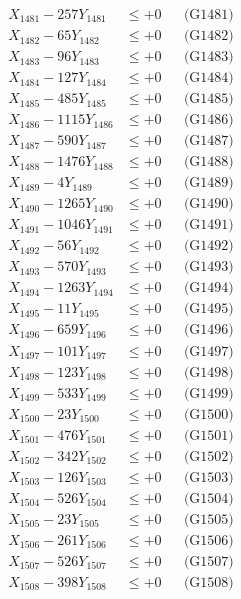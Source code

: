 \documentclass[a4paper,10pt]{article}
\begin{document}
{\begin{align}
\allowbreak
X_{1481} - 257Y_{1481} &\leq +0 && \text{(G1481)} \\
X_{1482} - 65Y_{1482} &\leq +0 && \text{(G1482)} \\
X_{1483} - 96Y_{1483} &\leq +0 && \text{(G1483)} \\
X_{1484} - 127Y_{1484} &\leq +0 && \text{(G1484)} \\
X_{1485} - 485Y_{1485} &\leq +0 && \text{(G1485)} \\
X_{1486} - 1115Y_{1486} &\leq +0 && \text{(G1486)} \\
X_{1487} - 590Y_{1487} &\leq +0 && \text{(G1487)} \\
X_{1488} - 1476Y_{1488} &\leq +0 && \text{(G1488)} \\
X_{1489} - 4Y_{1489} &\leq +0 && \text{(G1489)} \\
X_{1490} - 1265Y_{1490} &\leq +0 && \text{(G1490)} \\
\allowbreak
X_{1491} - 1046Y_{1491} &\leq +0 && \text{(G1491)} \\
X_{1492} - 56Y_{1492} &\leq +0 && \text{(G1492)} \\
X_{1493} - 570Y_{1493} &\leq +0 && \text{(G1493)} \\
X_{1494} - 1263Y_{1494} &\leq +0 && \text{(G1494)} \\
X_{1495} - 11Y_{1495} &\leq +0 && \text{(G1495)} \\
X_{1496} - 659Y_{1496} &\leq +0 && \text{(G1496)} \\
X_{1497} - 101Y_{1497} &\leq +0 && \text{(G1497)} \\
X_{1498} - 123Y_{1498} &\leq +0 && \text{(G1498)} \\
X_{1499} - 533Y_{1499} &\leq +0 && \text{(G1499)} \\
X_{1500} - 23Y_{1500} &\leq +0 && \text{(G1500)} \\
\allowbreak
X_{1501} - 476Y_{1501} &\leq +0 && \text{(G1501)} \\
X_{1502} - 342Y_{1502} &\leq +0 && \text{(G1502)} \\
X_{1503} - 126Y_{1503} &\leq +0 && \text{(G1503)} \\
X_{1504} - 526Y_{1504} &\leq +0 && \text{(G1504)} \\
X_{1505} - 23Y_{1505} &\leq +0 && \text{(G1505)} \\
X_{1506} - 261Y_{1506} &\leq +0 && \text{(G1506)} \\
X_{1507} - 526Y_{1507} &\leq +0 && \text{(G1507)} \\
X_{1508} - 398Y_{1508} &\leq +0 && \text{(G1508)} \\

\end{align}}
\end{document}
